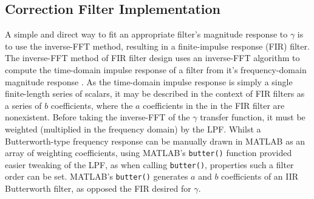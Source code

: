 \documentclass{report}
\begin{document}
        \subsection{Correction Filter Implementation}
            A simple and direct way to fit an appropriate filter's magnitude response to $\gamma$ is to use the inverse-FFT method, resulting in a finite-impulse response (FIR) filter.
            The inverse-FFT method of FIR filter design uses an inverse-FFT algorithm to compute the time-domain impulse response of a filter from it's frequency-domain magnitude response \cite{li2019digital}.
            As the time-domain impulse response is simply a single finite-length series of scalars, it may be described in the context of FIR filters as a series of $b$ coefficients, where the $a$ coefficients in the in the FIR filter are nonexistent.
            Before taking the inverse-FFT of the $\gamma$ transfer function, it must be weighted (multiplied in the frequency domain) by the LPF.
            Whilst a Butterworth-type frequency response can be manually drawn in MATLAB as an array of weighting coefficients, using MATLAB's \texttt{butter()} function provided easier tweaking of the LPF, as when calling \texttt{butter()}, properties such a filter order can be set.
            MATLAB's \texttt{butter()} generates $a$ and $b$ coefficients of an IIR Butterworth filter, as opposed the FIR desired for $\gamma$.
\end{document}
